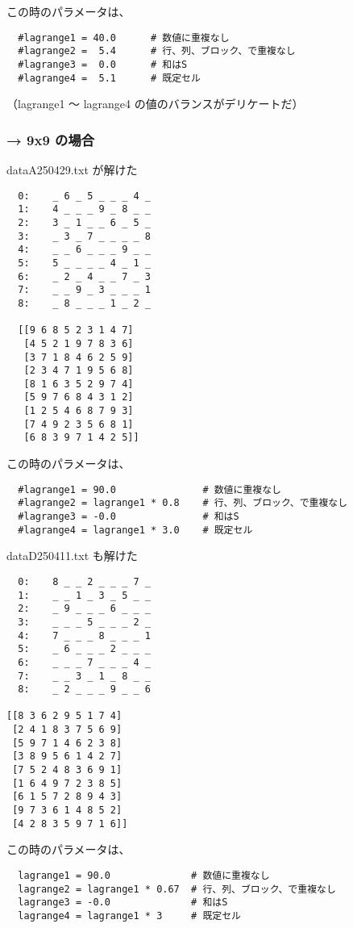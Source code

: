 \documentclass[uplatex,dvipdfmx,a4paper,11pt,oneside,openany]{jsbook}
\begin{document}
この時のパラメータは、
\begin{verbatim}
  #lagrange1 = 40.0      # 数値に重複なし
  #lagrange2 =  5.4      # 行、列、ブロック、で重複なし
  #lagrange3 =  0.0      # 和はS
  #lagrange4 =  5.1      # 既定セル
\end{verbatim}

（lagrange1 〜 lagrange4 の値のバランスがデリケートだ）

\subsubsection{→ 9x9 の場合}

dataA250429.txt が解けた
\begin{verbatim}
  0:	_ 6 _ 5 _ _ _ 4 _
  1:	4 _ _ _ 9 _ 8 _ _
  2:	3 _ 1 _ _ 6 _ 5 _
  3:	_ 3 _ 7 _ _ _ _ 8
  4:	_ _ 6 _ _ _ 9 _ _
  5:	5 _ _ _ _ 4 _ 1 _
  6:	_ 2 _ 4 _ _ 7 _ 3
  7:	_ _ 9 _ 3 _ _ _ 1
  8:	_ 8 _ _ _ 1 _ 2 _

  [[9 6 8 5 2 3 1 4 7]
   [4 5 2 1 9 7 8 3 6]
   [3 7 1 8 4 6 2 5 9]
   [2 3 4 7 1 9 5 6 8]
   [8 1 6 3 5 2 9 7 4]
   [5 9 7 6 8 4 3 1 2]
   [1 2 5 4 6 8 7 9 3]
   [7 4 9 2 3 5 6 8 1]
   [6 8 3 9 7 1 4 2 5]]
\end{verbatim}

この時のパラメータは、
\begin{verbatim}
  #lagrange1 = 90.0               # 数値に重複なし
  #lagrange2 = lagrange1 * 0.8    # 行、列、ブロック、で重複なし
  #lagrange3 = -0.0               # 和はS
  #lagrange4 = lagrange1 * 3.0    # 既定セル
\end{verbatim}

dataD250411.txt も解けた
\begin{verbatim}
  0:	8 _ _ 2 _ _ _ 7 _
  1:	_ _ 1 _ 3 _ 5 _ _
  2:	_ 9 _ _ _ 6 _ _ _
  3:	_ _ _ 5 _ _ _ 2 _
  4:	7 _ _ _ 8 _ _ _ 1
  5:	_ 6 _ _ _ 2 _ _ _
  6:	_ _ _ 7 _ _ _ 4 _
  7:	_ _ 3 _ 1 _ 8 _ _
  8:	_ 2 _ _ _ 9 _ _ 6

[[8 3 6 2 9 5 1 7 4]
 [2 4 1 8 3 7 5 6 9]
 [5 9 7 1 4 6 2 3 8]
 [3 8 9 5 6 1 4 2 7]
 [7 5 2 4 8 3 6 9 1]
 [1 6 4 9 7 2 3 8 5]
 [6 1 5 7 2 8 9 4 3]
 [9 7 3 6 1 4 8 5 2]
 [4 2 8 3 5 9 7 1 6]]
\end{verbatim}

この時のパラメータは、
\begin{verbatim}
  lagrange1 = 90.0              # 数値に重複なし
  lagrange2 = lagrange1 * 0.67  # 行、列、ブロック、で重複なし
  lagrange3 = -0.0              # 和はS
  lagrange4 = lagrange1 * 3     # 既定セル
\end{verbatim}
\end{document}
